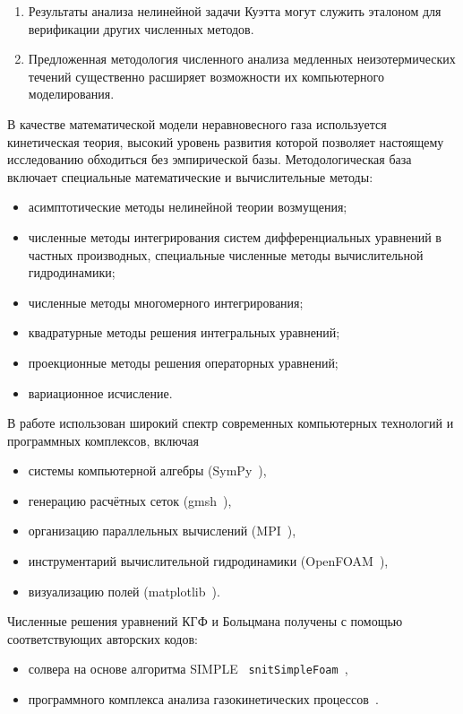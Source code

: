{\influence}
\begin{enumerate}
    \item Результаты анализа нелинейной задачи Куэтта могут служить эталоном
    для верификации других численных методов.
    \item Предложенная методология численного анализа медленных неизотермических течений
    существенно расширяет возможности их компьютерного моделирования.
\end{enumerate}

{\methods}
В качестве математической модели неравновесного газа используется кинетическая теория,
высокий уровень развития которой позволяет настоящему исследованию обходиться без эмпирической базы.
Методологическая база включает специальные математические и вычислительные методы:
\begin{itemize}
    \item асимптотические методы нелинейной теории возмущения;
    \item численные методы интегрирования систем дифференциальных уравнений в частных производных,
    специальные численные методы вычислительной гидродинамики;
    \item численные методы многомерного интегрирования;
    \item квадратурные методы решения интегральных уравнений;
    \item проекционные методы решения операторных уравнений;
    \item вариационное исчисление.
\end{itemize}
В работе использован широкий спектр современных компьютерных технологий и программных комплексов, включая
\begin{itemize}
    \item системы компьютерной алгебры (SymPy~\autocite{sympy}),
    \item генерацию расчётных сеток (gmsh~\autocite{gmsh}),
    \item организацию параллельных вычислений (MPI~\autocite{mpi}),
    \item инструментарий вычислительной гидродинамики (OpenFOAM~\autocite{openfoam}),
    \item визуализацию полей (matplotlib~\autocite{matplotlib}).
\end{itemize}
Численные решения уравнений КГФ и Больцмана получены с помощью соответствующих авторских кодов:
\begin{itemize}
    \item солвера на основе алгоритма SIMPLE~\autocite{SIMPLE} \verb+snitSimpleFoam+~\cite{Rogozin2014},
    \item программного комплекса анализа газокинетических процессов~\cite{Rogozin2010, Rogozin2011}.
\end{itemize}

